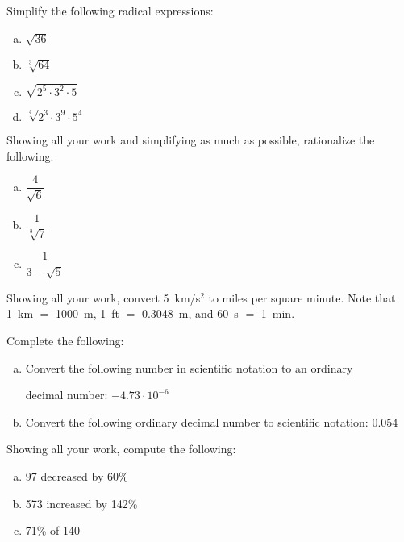 \documentclass[12pt,letterpaper]{exam}
\begin{document}
\begin{questions}
\newpage



\question[8] Simplify the following radical expressions: \pspace
	\begin{enumerate}[(a)]
	\item $\sqrt{36}$ \vfill
	\item $\sqrt[3]{64}$ \vfill
	\item $\sqrt{2^5 \cdot 3^2 \cdot 5}$ \vfill
	\item $\sqrt[4]{2^3 \cdot 3^9 \cdot 5^4}$ \vfill
	\end{enumerate}



\newpage



\question[6] Showing all your work and simplifying as much as possible, rationalize the following: \pspace
	\begin{enumerate}[(a)]
	\item $\dfrac{4}{\sqrt{6}}$ \vfill
	\item $\dfrac{1}{\sqrt[3]{7}}$ \vfill
	\item $\dfrac{1}{3 - \sqrt{5}}$ \vfill
	\end{enumerate}



\newpage



\question[8] Showing all your work, convert 5~km/s$^2$ to miles per square minute. Note that 1~km $=$ 1000~m, 1~ft $=$ 0.3048~m, and 60~s $=$ 1~min.



\newpage



\question[4] Complete the following:
	\begin{enumerate}[(a)]
	\item Convert the following number in scientific notation to an ordinary \par decimal number: $-4.73 \cdot 10^{-6}$ \vfill
	\item Convert the following ordinary decimal number to scientific notation: $0.054$ \vfill
	\end{enumerate} \vfill

\question[8] Showing all your work, compute the following: \pspace
        \begin{enumerate}[(a)]
        \item 97 decreased by 60\% \vfill
        \item 573 increased by 142\% \vfill
        \item 71\% of 140 \vfill
        \end{enumerate}




\end{questions}
\end{document}
